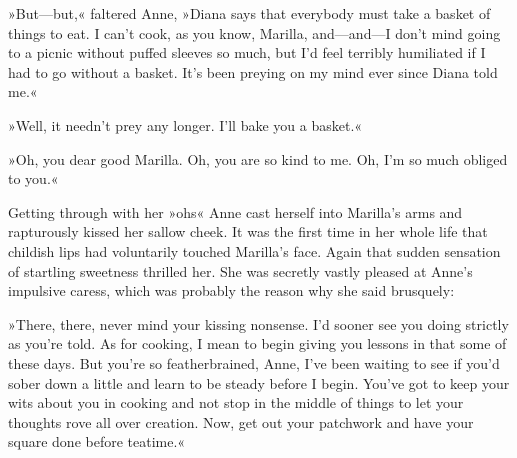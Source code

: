 »But—but,« faltered Anne, »Diana says that everybody must take a basket of things to eat. I can’t cook, as you know, Marilla, and—and—I don’t mind going to a picnic without puffed sleeves so much, but I’d feel terribly humiliated if I had to go without a basket. It’s been preying on my mind ever since Diana told me.«

»Well, it needn’t prey any longer. I’ll bake you a basket.«

»Oh, you dear good Marilla. Oh, you are so kind to me. Oh, I’m so much obliged to you.«

Getting through with her »ohs« Anne cast herself into Marilla’s arms and rapturously kissed her sallow cheek. It was the first time in her whole life that childish lips had voluntarily touched Marilla’s face. Again that sudden sensation of startling sweetness thrilled her. She was secretly vastly pleased at Anne’s impulsive caress, which was probably the reason why she said brusquely:

»There, there, never mind your kissing nonsense. I’d sooner see you doing strictly as you’re told. As for cooking, I mean to begin giving you lessons in that some of these days. But you’re so featherbrained, Anne, I’ve been waiting to see if you’d sober down a little and learn to be steady before I begin. You’ve got to keep your wits about you in cooking and not stop in the middle of things to let your thoughts rove all over creation. Now, get out your patchwork and have your square done before teatime.«

